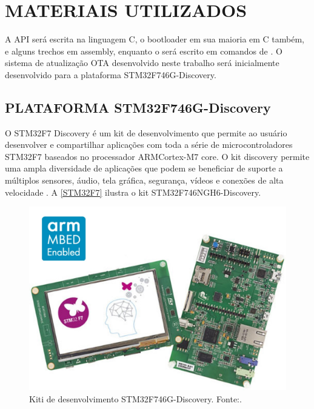\section{MATERIAIS UTILIZADOS}

A API será escrita na linguagem C, o bootloader em sua maioria em C também, e alguns trechos em assembly, enquanto o \linker será escrito em comandos de \linker. O sistema de atualização OTA desenvolvido neste trabalho será inicialmente desenvolvido para a plataforma STM32F746G-Discovery.

\subsection{PLATAFORMA STM32F746G-Discovery}

O STM32F7 Discovery é um kit de desenvolvimento que permite ao usuário desenvolver e compartilhar aplicações com toda a série de microcontroladores STM32F7 baseados no processador ARM\textregistered  Cortex\textregistered-M7 core.
O kit discovery permite uma ampla diversidade de aplicações que podem se beneficiar de suporte a múltiplos sensores, áudio, tela gráfica, segurança, vídeos e conexões de alta velocidade \cite{STM32F7}.
A \autoref{STM32F7} ilustra o kit STM32F746NGH6-Discovery.

\begin{figure}[H]
    \scriptsize
     \centering
     \includegraphics[scale=0.4]{dados/figuras/STM32F7.jpg}
     \caption{Kiti de desenvolvimento STM32F746G-Discovery. \newline Fonte:\cite{STM32F7}.}
     \label{STM32F7}
\end{figure}


